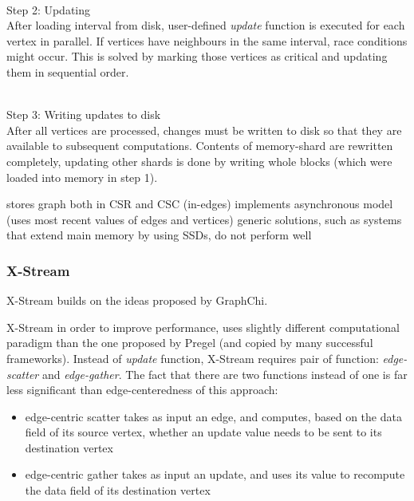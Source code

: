 \\
Step 2: Updating
\\
After loading interval from disk, user-defined \textit{update} function is executed for each vertex in parallel. If vertices have neighbours in the same interval, race conditions might occur. This is solved by marking those vertices as critical and updating them in sequential order.

\\
Step 3: Writing updates to disk
\\
After all vertices are processed, changes must be written to disk so that they are available to subsequent computations. Contents of memory-shard are rewritten completely, updating other shards is done by writing whole blocks (which were loaded into memory in step 1).

%

stores graph both in CSR and CSC (in-edges)
implements asynchronous model (uses most recent values of edges and vertices)
generic solutions, such as systems that extend main memory by using SSDs, do not perform well


\subsubsection{X-Stream}
X-Stream \cite{xstream-paper} builds on the ideas proposed by GraphChi.

X-Stream in order to improve performance, uses slightly different computational paradigm than the one proposed by Pregel (and copied by many successful frameworks). Instead of \textit{update} function, X-Stream requires pair of function: \textit{edge-scatter} and \textit{edge-gather}. The fact that there are two functions instead of one is far less significant than edge-centeredness of this approach: 
\begin{itemize}
    \item edge-centric scatter takes as input an edge, and computes, based on the data field of its source vertex, whether an update value needs to be sent to its destination vertex
    \item edge-centric gather takes as input an update, and uses its value to recompute the data field of its destination vertex
\end{itemize}

